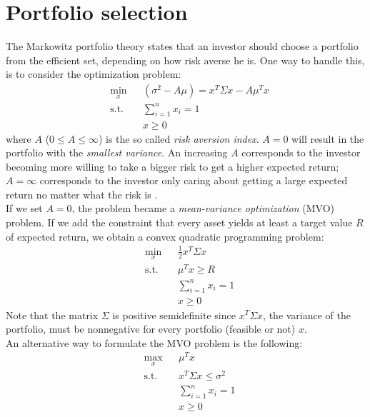 \section{Portfolio selection}
The Markowitz portfolio theory states that an investor should
choose a portfolio from the efficient set, depending on how risk averse he is. One way to handle this, is to consider the optimization problem\footnotemark[1]:
\begin{equation}
\begin{aligned}
&\min_x &&(\sigma^2 - A\mu) = x^T \Sigma x - A\mu^T x\\
&\text{s.t.}&&\sum\limits_{i=1}^n x_i=1\\
&&&x \geq 0
\end{aligned}
\end{equation}
where $A$ ($0 \leq A \leq \infty$) is the so called \textit{risk aversion index}. $A = 0$ will result in the portfolio with the \textit{smallest variance}. An increasing $A$ corresponds to the investor becoming more willing to take a bigger risk to get a higher expected return; $A = \infty$ corresponds to the investor only caring about getting a large expected return no matter what the risk is \cite{markovitz}.\\
If we set $A=0$, the problem became a \textit{mean-variance
optimization} (MVO) problem. If we add the constraint that every asset yields at least a target value $R$ of expected return, we obtain a convex quadratic programming problem:
\begin{equation}\label{eq:variance}
\begin{aligned}
&\min_x &&\frac{1}{2}x^T \Sigma x\\
&\text{s.t.}
&&\mu^T x \geq R\\
&&&\sum\limits_{i=1}^n x_i=1\\
&&&x \geq 0
\end{aligned}
\end{equation}
Note that the matrix $\Sigma$ is positive semidefinite since $x^T \Sigma x$, the variance of the portfolio, must be nonnegative for every portfolio (feasible or not) $x$.\\
An alternative way to formulate the MVO problem is the following:
\begin{equation}\label{eq:variance2}
\begin{aligned}
&\max_x &&\mu^Tx\\
&\text{s.t.}
&&x^T \Sigma x \leq \sigma^2\\
&&&\sum\limits_{i=1}^n x_i=1\\
&&&x \geq 0
\end{aligned}
\end{equation}

